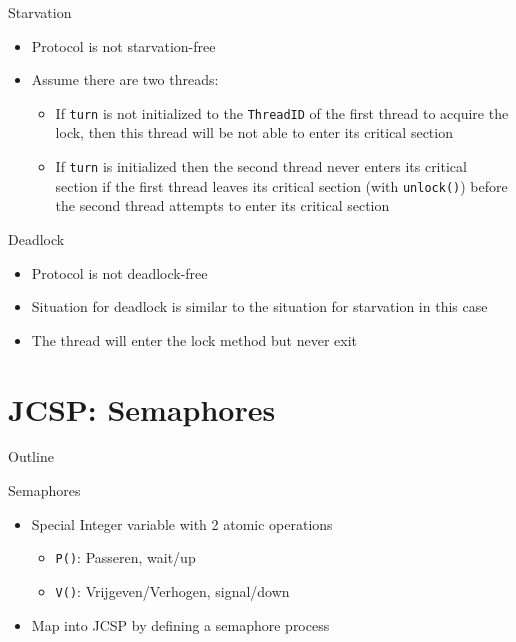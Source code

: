 \begin{frame}{Starvation}
  \begin{itemize}
  \item Protocol is not starvation-free
  \item Assume there are two threads:
    \begin{itemize}
    \item If \lstinline!turn! is not initialized to the
      \lstinline!ThreadID! of the first thread to acquire the lock,
      then this thread will be not able to enter its critical section
    \item If \lstinline!turn! is initialized then the second thread
      never enters its critical section if the first thread leaves its
      critical section (with \lstinline!unlock()!) before the second
      thread attempts to enter its critical section
    \end{itemize}
  \end{itemize}
\end{frame}

\begin{frame}{Deadlock}
  \begin{itemize}
  \item Protocol is not deadlock-free
  \item Situation for deadlock is similar to the situation for
    starvation in this case
  \item The thread will enter the lock method but never exit
  \end{itemize}
\end{frame}


\section{JCSP: Semaphores}

\begin{frame}{Outline}
  \tableofcontents[current]
\end{frame}

\begin{frame}[fragile]{Semaphores}
  \begin{itemize}
  \item Special Integer variable with 2 atomic operations
    \begin{itemize}
    \item \lstinline!P()!: Passeren, wait/up
    \item \lstinline!V()!: Vrijgeven/Verhogen, signal/down
    \end{itemize}
  \item Map into JCSP by defining a semaphore process
  \end{itemize}
\end{frame}

